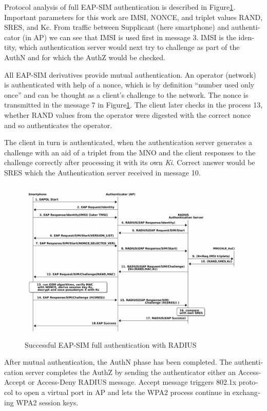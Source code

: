 \documentclass[12pt,a4paper,english]{tutthesis}
\begin{document}
\begin{otherlanguage}{english}
Protocol analysis of full EAP-SIM authentication is described 
in Figure\ref{fig:eap-sim-radius}.
Important parameters for this work are IMSI, NONCE, and triplet values
RAND, SRES, and Kc. 
From traffic between Supplicant (here smartphone) and authenticator (in AP)
we can see that IMSI is used first in message 3. IMSI is the
identity, which authentication server would next try to challenge as
part of the AuthN and for which the AuthZ would be checked.







All EAP-SIM derivatives provide mutual authentication.
An operator (network) is authenticated with help of a nonce,
which is by definition ``number used only once'' and can
be thought as a client's challenge to the network.
The nonce is transmitted in the message 7 in Figure\ref{fig:eap-sim-radius}.
The client later checks in the process 13, whether RAND values 
from
the operator were digested with the correct nonce and so authenticates
the operator.

The client in turn is authenticated, when the authentication server
generates a challenge with an aid of a triplet from the MNO and the
client responses to the challenge correctly after processing it with
its own \emph{Ki}.  Correct answer would be SRES which the Authentication
server received in message 10.
\begin{figure}[htb]
\centering
\includegraphics[width=.9\linewidth]{eap-sim-radius.png}
\caption{\label{fig:eap-sim-radius}Successful EAP-SIM full authentication with RADIUS}
\end{figure}



After mutual authentication, the AuthN phase has been completed. The
authentication server completes the AuthZ by sending the authenticator either
an Access-Accept or Access-Deny RADIUS message. 
Accept message triggers 802.1x protocol to open a virtual port in AP
and lets the WPA2 process continue in exchanging WPA2 session keys. 


\end{otherlanguage}
\end{document}
